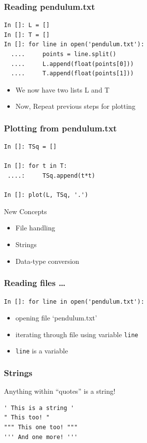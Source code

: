 \documentclass[14pt,compress]{beamer}
\newcommand{\typ}[1]{\lstinline{#1}}
\newcommand{\kwrd}[1]{ \texttt{\textbf{\color{blue}{#1}}}  }
\begin{document}
\begin{frame}[fragile]
\frametitle{Reading pendulum.txt}
\begin{lstlisting}
In []: L = []
In []: T = []
In []: for line in open('pendulum.txt'):
  ....     points = line.split()
  ....     L.append(float(points[0]))
  ....     T.append(float(points[1]))
\end{lstlisting}
\begin{itemize}
\item We now have two lists L and T
\item Now, Repeat previous steps for plotting
\end{itemize}
\end{frame}

\begin{frame}[fragile]
\frametitle{Plotting from pendulum.txt}
\begin{lstlisting}
In []: TSq = []

In []: for t in T:
 ....:     TSq.append(t*t)

In []: plot(L, TSq, '.')
\end{lstlisting}
\end{frame}

\begin{frame}{New Concepts}
  \begin{itemize}
    \item File handling
    \item Strings
    \item Data-type conversion
  \end{itemize}
\end{frame}

\begin{frame}[fragile]
  \frametitle{Reading files \ldots}
\typ{In []: for line in open('pendulum.txt'):}
\begin{itemize}
\item opening file `pendulum.txt'
\item iterating through file using variable \typ{line}
\item \typ{line} is a \kwrd{string} variable
\end{itemize}
\end{frame}

\begin{frame}[fragile]
\frametitle{Strings}
Anything within ``quotes'' is a string!
\begin{lstlisting}
' This is a string '  
" This too! "
""" This one too! """
''' And one more! '''
\end{lstlisting}
\end{frame}
\end{document}

